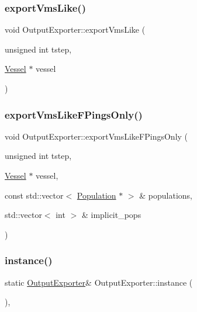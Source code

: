 \mbox{\label{class_output_exporter_a74907417fa0cded047e32b8ceb16b1e7}} 
\subsubsection{\texorpdfstring{exportVmsLike()}{exportVmsLike()}}
{\footnotesize\ttfamily void Output\+Exporter\+::export\+Vms\+Like (\begin{DoxyParamCaption}\item[{unsigned int}]{tstep,  }\item[{\mbox{\hyperlink{class_vessel}{Vessel}} $\ast$}]{vessel }\end{DoxyParamCaption})}

\mbox{\label{class_output_exporter_a07907c5123462b2da0d3440f50b32c0c}} 
\subsubsection{\texorpdfstring{exportVmsLikeFPingsOnly()}{exportVmsLikeFPingsOnly()}}
{\footnotesize\ttfamily void Output\+Exporter\+::export\+Vms\+Like\+F\+Pings\+Only (\begin{DoxyParamCaption}\item[{unsigned int}]{tstep,  }\item[{\mbox{\hyperlink{class_vessel}{Vessel}} $\ast$}]{vessel,  }\item[{const std\+::vector$<$ \mbox{\hyperlink{class_population}{Population}} $\ast$ $>$ \&}]{populations,  }\item[{std\+::vector$<$ int $>$ \&}]{implicit\+\_\+pops }\end{DoxyParamCaption})}

\mbox{\label{class_output_exporter_a174644830e22ece49c6015ef96c11d8e}} 
\subsubsection{\texorpdfstring{instance()}{instance()}}
{\footnotesize\ttfamily static \mbox{\hyperlink{class_output_exporter}{Output\+Exporter}}\& Output\+Exporter\+::instance (\begin{DoxyParamCaption}{ }\end{DoxyParamCaption})\hspace{0.3cm}{\ttfamily [inline]}, {\ttfamily [static]}}

